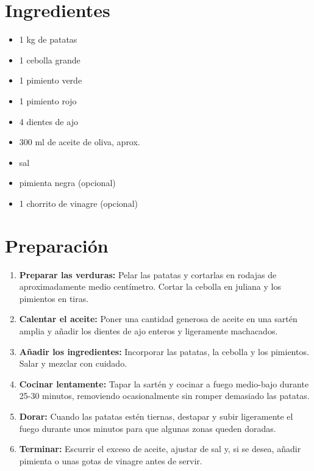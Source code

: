 
    \begin{minipage}[t]{0.35\textwidth}
        \section*{Ingredientes}
        \begin{itemize}[leftmargin=*]
            \item 1 kg de patatas
            \item 1 cebolla grande
            \item 1 pimiento verde
            \item 1 pimiento rojo
            \item 4 dientes de ajo
            \item 300 ml de aceite de oliva, aprox.
            \item sal
            \item pimienta negra (opcional)
            \item 1 chorrito de vinagre (opcional)
        \end{itemize}
    \end{minipage}
    \hfill
    \begin{minipage}[t]{0.6\textwidth}
        \section*{Preparación}
        \begin{enumerate}
            \item \textbf{Preparar las verduras:} Pelar las patatas y cortarlas en rodajas de aproximadamente medio centímetro. Cortar la cebolla en juliana y los pimientos en tiras.
            \item \textbf{Calentar el aceite:} Poner una cantidad generosa de aceite en una sartén amplia y añadir los dientes de ajo enteros y ligeramente machacados.
            \item \textbf{Añadir los ingredientes:} Incorporar las patatas, la cebolla y los pimientos. Salar y mezclar con cuidado.
            \item \textbf{Cocinar lentamente:} Tapar la sartén y cocinar a fuego medio-bajo durante 25-30 minutos, removiendo ocasionalmente sin romper demasiado las patatas.
            \item \textbf{Dorar:} Cuando las patatas estén tiernas, destapar y subir ligeramente el fuego durante unos minutos para que algunas zonas queden doradas.
            \item \textbf{Terminar:} Escurrir el exceso de aceite, ajustar de sal y, si se desea, añadir pimienta o unas gotas de vinagre antes de servir.
        \end{enumerate}
    \end{minipage}

